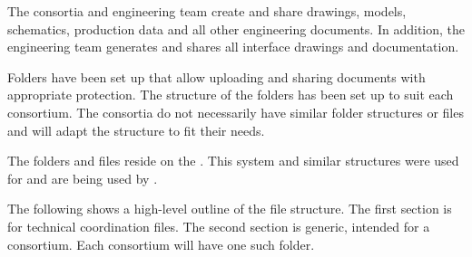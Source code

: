 The consortia and  engineering team create and share
drawings, models, schematics, production data and all other
engineering documents. In addition, the  engineering team
generates and shares all interface drawings and documentation.


Folders have been set up that allow uploading and sharing
documents with appropriate protection. The structure of the folders
has been set up to suit each consortium. The
consortia do not necessarily have similar folder structures or files and will adapt
the structure to fit their needs.


The folders and files reside on the . This system and
similar structures were used for  and are being
used by .


The following shows a high-level outline of the file structure. The
first section is for technical coordination files. The second
section is generic, intended for a consortium. Each consortium will have one such
folder.
